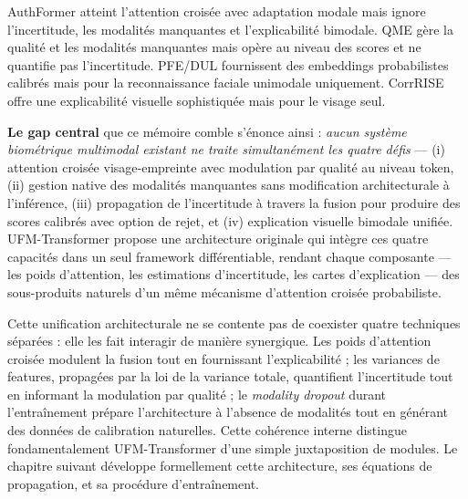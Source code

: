 \documentclass[12pt,a4paper]{report}
\begin{document}
AuthFormer \cite{yang2024authformer} atteint l'attention crois\'{e}e avec adaptation modale mais ignore l'incertitude, les modalit\'{e}s manquantes et l'explicabilit\'{e} bimodale. QME \cite{zhu2025qme} g\`{e}re la qualit\'{e} et les modalit\'{e}s manquantes mais op\`{e}re au niveau des scores et ne quantifie pas l'incertitude. PFE/DUL \cite{shi2019pfe, chang2020data} fournissent des embeddings probabilistes calibr\'{e}s mais pour la reconnaissance faciale unimodale uniquement. CorrRISE \cite{lu2024corrRISE} offre une explicabilit\'{e} visuelle sophistiqu\'{e}e mais pour le visage seul.

\textbf{Le gap central} que ce m\'{e}moire comble s'\'{e}nonce ainsi : \textit{aucun syst\`{e}me biom\'{e}trique multimodal existant ne traite simultan\'{e}ment les quatre d\'{e}fis} --- (i) attention crois\'{e}e visage-empreinte avec modulation par qualit\'{e} au niveau token, (ii) gestion native des modalit\'{e}s manquantes sans modification architecturale \`{a} l'inf\'{e}rence, (iii) propagation de l'incertitude \`{a} travers la fusion pour produire des scores calibr\'{e}s avec option de rejet, et (iv) explication visuelle bimodale unifi\'{e}e. UFM-Transformer propose une architecture originale qui int\`{e}gre ces quatre capacit\'{e}s dans un seul framework diff\'{e}rentiable, rendant chaque composante --- les poids d'attention, les estimations d'incertitude, les cartes d'explication --- des sous-produits naturels d'un m\^{e}me m\'{e}canisme d'attention crois\'{e}e probabiliste.

Cette unification architecturale ne se contente pas de coexister quatre techniques s\'{e}par\'{e}es : elle les fait interagir de mani\`{e}re synergique. Les poids d'attention crois\'{e}e modulent la fusion tout en fournissant l'explicabilit\'{e} ; les variances de features, propag\'{e}es par la loi de la variance totale, quantifient l'incertitude tout en informant la modulation par qualit\'{e} ; le \textit{modality dropout} durant l'entra\^{i}nement pr\'{e}pare l'architecture \`{a} l'absence de modalit\'{e}s tout en g\'{e}n\'{e}rant des donn\'{e}es de calibration naturelles. Cette coh\'{e}rence interne distingue fondamentalement UFM-Transformer d'une simple juxtaposition de modules. Le chapitre suivant d\'{e}veloppe formellement cette architecture, ses \'{e}quations de propagation, et sa proc\'{e}dure d'entra\^{i}nement.

\end{document}
